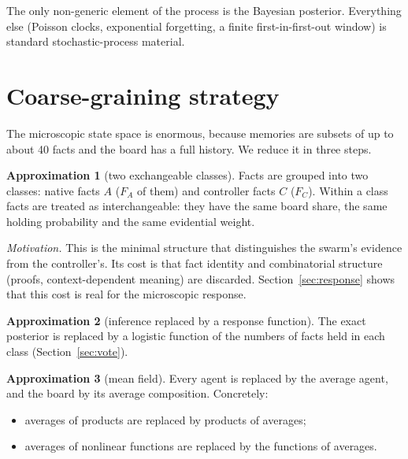 \documentclass[10pt,a4paper]{article}
\theoremstyle{definition}
\newtheorem{apx}{Approximation}
\begin{document}
The only non-generic element of the process is the Bayesian posterior. Everything else (Poisson clocks, exponential
forgetting, a finite first-in-first-out window) is standard stochastic-process material.

\section{Coarse-graining strategy}
\label{sec:coarse}
The microscopic state space is enormous, because memories are subsets of up to about 40 facts and the board has a full
history. We reduce it in three steps.

\begin{apx}[two exchangeable classes]\label{ap:classes}
Facts are grouped into two classes: native facts $A$ ($F_A$ of them) and controller facts $C$ ($F_C$). Within a class
facts are treated as interchangeable: they have the same board share, the same holding probability and the same
evidential weight.
\end{apx}
\noindent\textit{Motivation.} This is the minimal structure that distinguishes the swarm's evidence from the
controller's. Its cost is that fact identity and combinatorial structure (proofs, context-dependent meaning) are
discarded. Section~\ref{sec:response} shows that this cost is real for the microscopic response.

\begin{apx}[inference replaced by a response function]\label{ap:response}
The exact posterior is replaced by a logistic function of the numbers of facts held in each class
(Section~\ref{sec:vote}).
\end{apx}

\begin{apx}[mean field]\label{ap:mf}
Every agent is replaced by the average agent, and the board by its average composition. Concretely:
\begin{itemize}
\item averages of products are replaced by products of averages;
\item averages of nonlinear functions are replaced by the functions of averages.
\end{itemize}
\end{apx}
\end{document}
